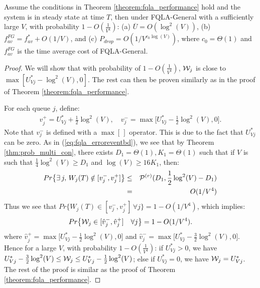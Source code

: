 \documentclass[journal]{IEEEtran}
\newcommand{\prob}{Pr}
\newcommand{\script}[1]{{{\cal{#1} }}}
\begin{document}
\begin{thm}\label{theorem:fqla_performance2}
Assume the conditions in Theorem \ref{theorem:fqla_performance} hold and the system is in steady state at time $T$, then under FQLA-General with a sufficiently large $V$, with probability   $1-O(\frac{1}{V^4})$:
(a) $\overline{U}=O(\log^2(V))$, (b)
$f^{FG}_{av}=f^*_{av}+O(1/V)$, and (c) $P_{drop} = O(1/V^{c_0\log(V)})$, 
where $c_0=\Theta(1)$ and $f_{av}^{FG}$ is the time average cost of FQLA-General.
\end{thm}
\begin{proof} We will show that with probability of $1-O(\frac{1}{V^4})$, $\script{W}_j$ is close to $\max[U^*_{Vj}-\log^2(V), 0]$. The rest can then be proven similarly as in the proof of Theorem \ref{theorem:fqla_performance}. 

For each queue $j$, define:
\begin{eqnarray*}
v_j^+=U^*_{Vj}+\frac{1}{2}\log^2(V),\quad v^-_j=\max\big[U^*_{Vj}-\frac{1}{2}\log^2(V),0\big].
\end{eqnarray*}
Note that $v^-_j$ is defined with a $\max [\,]$ operator. This is due to the fact that $U^*_{Vj}$ can be zero. As in (\ref{eq:fqla_erroreventbd}), we see that by Theorem \ref{thm:prob_multi_con}, there exists $D_1=\Theta(1), K_1=\Theta(1)$ such that if $V$ is such that $\frac{1}{4}\log^2(V)\geq D_1$ and $\log(V)\geq16K_1$, then:
\begin{eqnarray*}
\prob\big\{\exists\, j,\,W_j(T)\notin[v_j^-, v_j^+]\big\}&\leq& \script{P}^{(r)}(D_1, \frac{1}{2}\log^2(V)-D_1)\\
&= &O(1/V^4)
\end{eqnarray*}
Thus we see that $\prob\big\{W_j(T)\in[v_j^-, v_j^+]\,\forall j\big\}=1- O(1/V^4)$, which implies: 
\begin{eqnarray*}
\prob\big\{\script{W}_j\in[\hat{v}_j^-, \hat{v}_j^+]\quad\forall j\big\}= 1- O(1/V^4).
\end{eqnarray*}
where $\hat{v}_j^+=\max\big[U^*_{Vj}-\frac{1}{2}\log^2(V), 0\big]$ and  $\hat{v}_j^-=\max\big[U^*_{Vj}-\frac{3}{2}\log^2(V),0\big]$. Hence for a large $V$, with probability  $1-O(\frac{1}{V^4})$: if $U^*_{Vj}>0$, we have $U^*_{Vj}-\frac{3}{2}\log^2(V)\leq \script{W}_j\leq U^*_{Vj}-\frac{1}{2}\log^2(V)$; else if $U^*_{Vj}=0$, we have $\script{W}_j=U^*_{Vj}$. The rest of the proof is similar as the proof of Theorem \ref{theorem:fqla_performance}.  
\end{proof}
\end{document}
